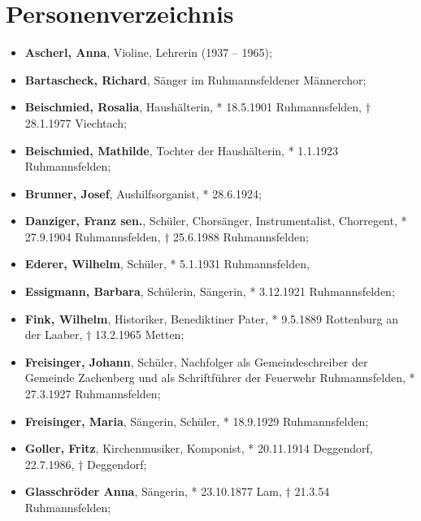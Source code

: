 \section{Personenverzeichnis}

\begin{itemize}

\item \textbf{Ascherl, Anna},
Violine, Lehrerin (1937 – 1965);

\item \textbf{Bartascheck, Richard}, Sänger im Ruhmannsfeldener
Männerchor;

\item \textbf{Beischmied, Rosalia}, Haushälterin, * 18.5.1901
Ruhmannsfelden, † 28.1.1977 Viechtach;

\item \textbf{Beischmied, Mathilde}, Tochter der Haushälterin,
* 1.1.1923 Ruhmannsfelden;

\item \textbf{Brunner, Josef}, Aushilfsorganist, * 28.6.1924;

\item \textbf{Danziger, Franz sen.}, Schüler, Chorsänger,
Instrumentalist, Chorregent, * 27.9.1904 Ruhmannsfelden, † 25.6.1988
Ruhmannsfelden;

\item \textbf{Ederer, Wilhelm}, Schüler, * 5.1.1931 Ruhmannsfelden,

\item \textbf{Essigmann, Barbara}, Schülerin, Sängerin, *
3.12.1921 Ruhmannsfelden;

\item \textbf{Fink, Wilhelm}, Historiker, Benediktiner Pater, * 9.5.1889
Rottenburg an der Laaber, † 13.2.1965 Metten;

\item \textbf{Freisinger, Johann}, Schüler, Nachfolger als
Gemeindeschreiber der Gemeinde Zachenberg und als Schriftführer der
Feuerwehr Ruhmannsfelden, * 27.3.1927 Ruhmannsfelden;

\item \textbf{Freisinger, Maria}, Sängerin, Schüler, * 18.9.1929
Ruhmannsfelden;

\item \textbf{Goller, Fritz}, Kirchenmusiker, Komponist, * 20.11.1914
Deggendorf, 22.7.1986, † Deggendorf;

\item \textbf{Glasschröder Anna}, Sängerin, * 23.10.1877 Lam, †
21.3.54 Ruhmannsfelden;


\end{itemize}
